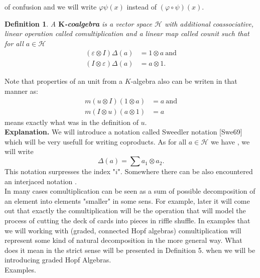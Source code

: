 \documentclass[a4paper]{article}
\newtheorem{definition}{Definition}
\begin{document}
of confusion and we will write 
$\varphi \psi (x)$ instead of $(\varphi \circ \psi)(x)$.
\begin{definition}
A \textbf{$\textbf{K}$-coalgebra} is a vector space $\mathcal{H}$ 
with additional coassociative, linear operation
 called comultiplication and
a linear map  called counit such that for all
$a \in \mathcal{H}$
\begin{align*}
(\varepsilon \otimes I)\Delta(a) &= 1 \otimes a \mathrm{\ and} \\
(I \otimes \varepsilon)\Delta(a) &= a \otimes 1.
\end{align*}
\end{definition}
Note that properties of an unit from a $K$-algebra also can be writen in that manner as:
\begin{align*}
m(u \otimes I)(1 \otimes a) &= a \mathrm{\ and}\\
m(I \otimes u)(a \otimes 1) &= a
\end{align*}
means exactly what was in the definition of $u$. \\[8pt]
\textbf{Explanation.} We will introduce a notation called Sweedler notation [Swe69] which will be 
very usefull 
for writing coproducts. As for all $a \in \mathcal{H}$ we have 
, we will write 
\begin{equation*}
\Delta(a) = \displaystyle\sum a_1 \otimes a_2.
\end{equation*} 
This notation surpresses the index "$i$". Somewhere there can be also encountered an interjaced 
notation . \\
In many cases comultiplication can be seen as a sum of possible decomposition of an element into 
elements "smaller" in some sens. 
For example, later it will come out that exactly the comultiplication will be the operation that will 
model the process of cutting the deck of cards into pieces in riffle shuffle. In examples that we will working 
with (graded, connected Hopf algebras) comultiplication will represent some kind of natural decomposition 
in the more general way. What does it mean in the strict sense will be presented in Definition 5. when we 
will be introducing graded Hopf Algebras. \\
Examples. \\[8pt]
\end{document}
